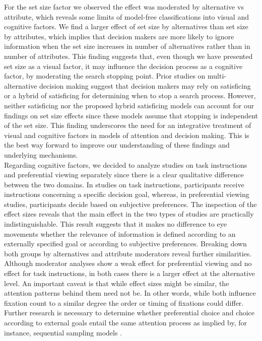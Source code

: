 \documentclass[english,natbib,man,floatsintext]{apa6}
\begin{document}
For the set size factor we observed the effect was moderated by alternative vs attribute, which reveals some limits of model-free classifications into visual and cognitive factors. We find a larger effect of set size by alternatives than set size by attributes, which implies that decision makers are more likely to ignore information when the set size increases in number of alternatives rather than in number of attributes. This finding suggests that, even though we have presented set size as a visual factor, it may influence the decision process as a cognitive factor, by moderating the search stopping point. Prior studies on multi-alternative decision making \cite{reutskaja2011, stuttgen2012, thomas2020} suggest that decision makers may rely on satisficing or a hybrid of satisficing for determining when to stop a search process. However, neither satisficing nor the proposed hybrid satisficing models can account for our findings on set size effects since these models assume that stopping is independent of the set size. This finding underscores the need for an integrative treatment of visual and cognitive factors in models of attention and decision making. This is the best way forward to improve our understanding of these findings and underlying mechanisms.\\

Regarding cognitive factors, we decided to analyze studies on task instructions and preferential viewing separately since there is a clear qualitative difference between the two domains. In studies on task instructions, participants receive instructions concerning a specific decision goal, whereas, in preferential viewing studies, participants decide based on subjective preferences. The inspection of the effect sizes reveals that the main effect in the two types of studies are practically indistinguishable. This result suggests that it makes no difference to eye movements whether the relevance of information is defined according to an externally specified goal or according to subjective preferences. Breaking down both groups by alternatives and attribute moderators reveal further similarities. Although moderator analyses show a weak effect for preferential viewing and no effect for task instructions, in both cases there is a larger effect at the alternative level. An important caveat is that while effect sizes might be similar, the attention patterns behind them need not be. In other words, while both influence fixation count to a similar degree the order or timing of fixations could differ. Further research is necessary to determine whether preferential choice and choice according to external goals entail the same attention process as implied by, for instance, sequential sampling models \citep{forstmann2016}.\\ 
\end{document}
